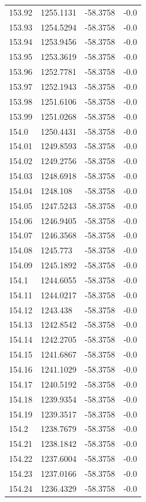 \begin{table}[H]
\begin{tabular}{llll}
153.92 & 1255.1131 & -58.3758 & -0.0 \\
153.93 & 1254.5294 & -58.3758 & -0.0 \\
153.94 & 1253.9456 & -58.3758 & -0.0 \\
153.95 & 1253.3619 & -58.3758 & -0.0 \\
153.96 & 1252.7781 & -58.3758 & -0.0 \\
153.97 & 1252.1943 & -58.3758 & -0.0 \\
153.98 & 1251.6106 & -58.3758 & -0.0 \\
153.99 & 1251.0268 & -58.3758 & -0.0 \\
154.0 & 1250.4431 & -58.3758 & -0.0 \\
154.01 & 1249.8593 & -58.3758 & -0.0 \\
154.02 & 1249.2756 & -58.3758 & -0.0 \\
154.03 & 1248.6918 & -58.3758 & -0.0 \\
154.04 & 1248.108 & -58.3758 & -0.0 \\
154.05 & 1247.5243 & -58.3758 & -0.0 \\
154.06 & 1246.9405 & -58.3758 & -0.0 \\
154.07 & 1246.3568 & -58.3758 & -0.0 \\
154.08 & 1245.773 & -58.3758 & -0.0 \\
154.09 & 1245.1892 & -58.3758 & -0.0 \\
154.1 & 1244.6055 & -58.3758 & -0.0 \\
154.11 & 1244.0217 & -58.3758 & -0.0 \\
154.12 & 1243.438 & -58.3758 & -0.0 \\
154.13 & 1242.8542 & -58.3758 & -0.0 \\
154.14 & 1242.2705 & -58.3758 & -0.0 \\
154.15 & 1241.6867 & -58.3758 & -0.0 \\
154.16 & 1241.1029 & -58.3758 & -0.0 \\
154.17 & 1240.5192 & -58.3758 & -0.0 \\
154.18 & 1239.9354 & -58.3758 & -0.0 \\
154.19 & 1239.3517 & -58.3758 & -0.0 \\
154.2 & 1238.7679 & -58.3758 & -0.0 \\
154.21 & 1238.1842 & -58.3758 & -0.0 \\
154.22 & 1237.6004 & -58.3758 & -0.0 \\
154.23 & 1237.0166 & -58.3758 & -0.0 \\
154.24 & 1236.4329 & -58.3758 & -0.0 \\

\end{tabular}
\end{table}
